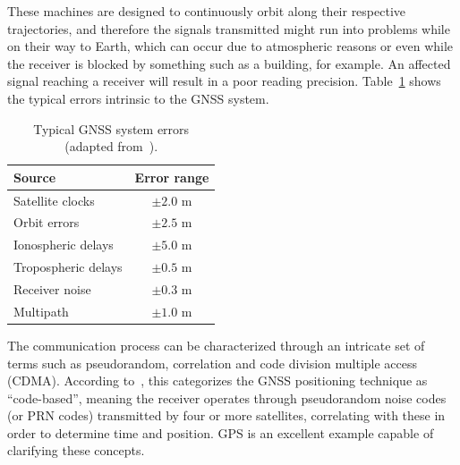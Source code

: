 These machines are designed to continuously orbit along their respective trajectories, and therefore the signals transmitted might run into problems while on their way to Earth, which can occur due to atmospheric reasons or even while the receiver is blocked by something such as a building, for example. An affected signal reaching a receiver will result in a poor reading precision. Table~\ref{tab:GNSS_sys_errors} shows the typical errors intrinsic to the GNSS system.

\begingroup
\begin{table}[h]
	\caption{Typical GNSS system errors (adapted from~\cite{novatel_gnss}).}
	\label{tab:GNSS_sys_errors}
	\centering%
	\begin{tabular}{lc}
        \toprule
        \textbf{Source} & \textbf{Error range} \\
        \midrule
        Satellite clocks & $\pm 2.0$ m \\
        \midrule
        Orbit errors & $\pm 2.5$ m \\
        \midrule
        Ionospheric delays & $\pm 5.0$ m \\
        \midrule
        Tropospheric delays & $\pm 0.5$ m \\
        \midrule
        Receiver noise & $\pm 0.3$ m \\
        \midrule
        Multipath & $\pm 1.0$ m \\
        \bottomrule
    \end{tabular}
\end{table}
\endgroup

The communication process can be characterized through an intricate set of terms such as \gls{pseudorandom}, \gls{correlation} and code division multiple access (CDMA). According to~\cite{novatel_gnss}, this categorizes the GNSS positioning technique as ``code-based'', meaning the receiver operates through pseudorandom noise codes (or PRN codes) transmitted by four or more satellites, correlating with these in order to determine time and position. GPS is an excellent example capable of clarifying these concepts.

